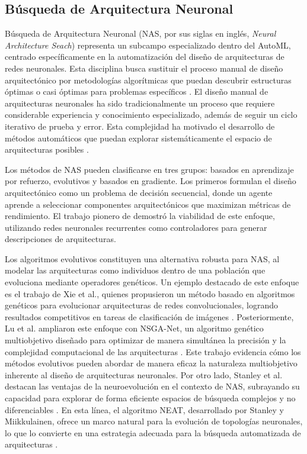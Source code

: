 \subsection{Búsqueda de Arquitectura Neuronal}

Búsqueda de Arquitectura Neuronal (NAS, por sus siglas en inglés, \textit{Neural Architecture Seach}) representa un subcampo especializado dentro del AutoML, centrado específicamente en la automatización del diseño de arquitecturas de redes neuronales. Esta disciplina busca sustituir el proceso manual de diseño arquitectónico por metodologías algorítmicas que puedan descubrir estructuras óptimas o casi óptimas para problemas específicos \cite{Elsken2019}. El diseño manual de arquitecturas neuronales ha sido tradicionalmente un proceso que requiere considerable experiencia y conocimiento especializado, además de seguir un ciclo iterativo de prueba y error. Esta complejidad ha motivado el desarrollo de métodos automáticos que puedan explorar sistemáticamente el espacio de arquitecturas posibles \cite{Zoph2017}.


Los métodos de NAS pueden clasificarse en tres grupos: basados en aprendizaje por refuerzo, evolutivos y basados en gradiente. Los primeros formulan el diseño arquitectónico como un problema de decisión secuencial, donde un agente aprende a seleccionar componentes arquitectónicos que maximizan métricas de rendimiento. El trabajo pionero de \cite{Zoph2017} demostró la viabilidad de este enfoque, utilizando redes neuronales recurrentes como controladores para generar descripciones de arquitecturas.

Los algoritmos evolutivos constituyen una alternativa robusta para NAS, al modelar las arquitecturas como individuos dentro de una población que evoluciona mediante operadores genéticos. Un ejemplo destacado de este enfoque es el trabajo de Xie et al., quienes propusieron un método basado en algoritmos genéticos para evolucionar arquitecturas de redes convolucionales, logrando resultados competitivos en tareas de clasificación de imágenes \cite{Xie2017}. Posteriormente, Lu et al. ampliaron este enfoque con NSGA-Net, un algoritmo genético multiobjetivo diseñado para optimizar de manera simultánea la precisión y la complejidad computacional de las arquitecturas \cite{Lu2018}. Este trabajo evidencia cómo los métodos evolutivos pueden abordar de manera eficaz la naturaleza multiobjetivo inherente al diseño de arquitecturas neuronales. Por otro lado, Stanley et al. destacan las ventajas de la neuroevolución en el contexto de NAS, subrayando su capacidad para explorar de forma eficiente espacios de búsqueda complejos y no diferenciables \cite{Stanley2019}. En esta línea, el algoritmo NEAT, desarrollado por Stanley y Miikkulainen, ofrece un marco natural para la evolución de topologías neuronales, lo que lo convierte en una estrategia adecuada para la búsqueda automatizada de arquitecturas \cite{Stanley2002}.




